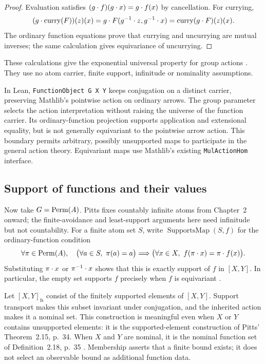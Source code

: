 \begin{proof}
Evaluation satisfies
$(g\mathbin{\cdot} f)(g\mathbin{\cdot} x)=g\mathbin{\cdot} f(x)$ by cancellation. For currying,
\[
  (g\mathbin{\cdot}\operatorname{curry}(F))(z)(x)
    =g\mathbin{\cdot} F(g^{-1}\mathbin{\cdot} z,g^{-1}\mathbin{\cdot} x)
    =\operatorname{curry}(g\mathbin{\cdot} F)(z)(x).
\]
The ordinary function equations prove that currying and uncurrying are
mutual inverses; the same calculation gives equivariance of uncurrying.
\end{proof}

These calculations give the exponential universal property for group
actions \cite[Theorem~1.7, pp.~18--19]{pitts2013}. They use no atom carrier,
finite support, infinitude or nominality assumptions.

In Lean, \texttt{FunctionObject G X Y} keeps conjugation on a distinct carrier,
preserving Mathlib's pointwise action on ordinary arrows. The group parameter
selects the action interpretation without raising the universe of the function
carrier. Its ordinary-function projection supports application and extensional
equality, but is not generally equivariant to the pointwise arrow action.
This boundary permits arbitrary, possibly unsupported maps to participate in
the general action theory. Equivariant maps use Mathlib's existing
\texttt{MulActionHom} interface.

\subsection{Support of functions and their values}
\label{sec:function-support}

Now take $G=\operatorname{Perm}(A)$. Pitts fixes countably infinite atoms from
Chapter~2 onward; the finite-avoidance and least-support arguments here
need infinitude but not countability. For a finite atom set $S$, write
$\operatorname{SupportsMap}(S,f)$ for the ordinary-function condition
\begin{equation}
  \forall\pi\in\operatorname{Perm}(A),\quad
  \bigl(\forall a\in S,\ \pi(a)=a\bigr)
    \Longrightarrow
  \bigl(\forall x\in X,\ f(\pi\mathbin{\cdot} x)=\pi\mathbin{\cdot} f(x)\bigr).
  \label{eq:supports-map}
\end{equation}
Substituting $\pi\mathbin{\cdot} x$ or $\pi^{-1}\mathbin{\cdot} x$ shows that this is
exactly support of $f$ in $[X,Y]$. In particular, the empty set supports
$f$ precisely when $f$ is equivariant
\cite[Lemma~2.17, p.~35]{pitts2013}.

Let $[X,Y]_{\mathrm{fs}}$ consist of the finitely supported elements of
$[X,Y]$. Support transport makes this subset invariant under conjugation,
and the inherited action makes it a nominal set. This construction is
meaningful even when $X$ or $Y$ contains unsupported elements: it is the
supported-element construction of Pitts' Theorem~2.15, p.~34. When $X$
and $Y$ are nominal, it is the nominal function set of Definition~2.18,
p.~35 \cite{pitts2013}. Membership asserts that a finite bound exists;
it does not select an observable bound as additional function data.

